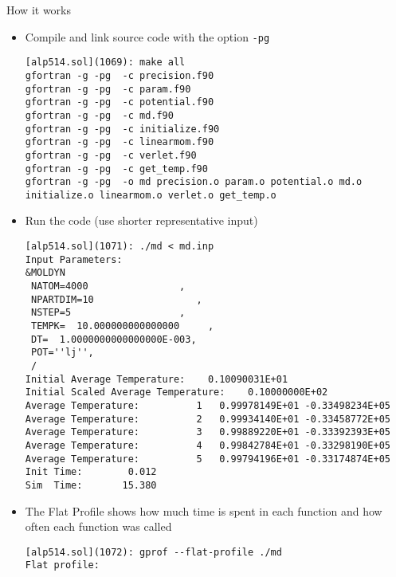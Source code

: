 \documentclass[10pt,t]{beamer}
\begin{document}
\begin{frame}{How it works}
  \begin{itemize}
  \item Compile and link source code with the option \lstinline|-pg|
    \begin{lstlisting}
[alp514.sol](1069): make all
gfortran -g -pg  -c precision.f90
gfortran -g -pg  -c param.f90
gfortran -g -pg  -c potential.f90
gfortran -g -pg  -c md.f90
gfortran -g -pg  -c initialize.f90
gfortran -g -pg  -c linearmom.f90
gfortran -g -pg  -c verlet.f90
gfortran -g -pg  -c get_temp.f90
gfortran -g -pg  -o md precision.o param.o potential.o md.o initialize.o linearmom.o verlet.o get_temp.o
    \end{lstlisting}
    \framebreak
    \item Run the code (use shorter representative input)
      \begin{lstlisting}
[alp514.sol](1071): ./md < md.inp
Input Parameters:
&MOLDYN
 NATOM=4000                ,
 NPARTDIM=10                  ,
 NSTEP=5                   ,
 TEMPK=  10.000000000000000     ,
 DT=  1.0000000000000000E-003,
 POT=''lj'',
 /
Initial Average Temperature:    0.10090031E+01
Initial Scaled Average Temperature:    0.10000000E+02
Average Temperature:          1   0.99978149E+01 -0.33498234E+05
Average Temperature:          2   0.99934140E+01 -0.33458772E+05
Average Temperature:          3   0.99889220E+01 -0.33392393E+05
Average Temperature:          4   0.99842784E+01 -0.33298190E+05
Average Temperature:          5   0.99794196E+01 -0.33174874E+05
Init Time:        0.012
Sim  Time:       15.380
      \end{lstlisting}
      \framebreak
    \item The Flat Profile shows how much time is spent in each function and how often each function was called
      \begin{lstlisting}
[alp514.sol](1072): gprof --flat-profile ./md
Flat profile:


\end{lstlisting}
\end{itemize}
\end{frame}
\end{document}
